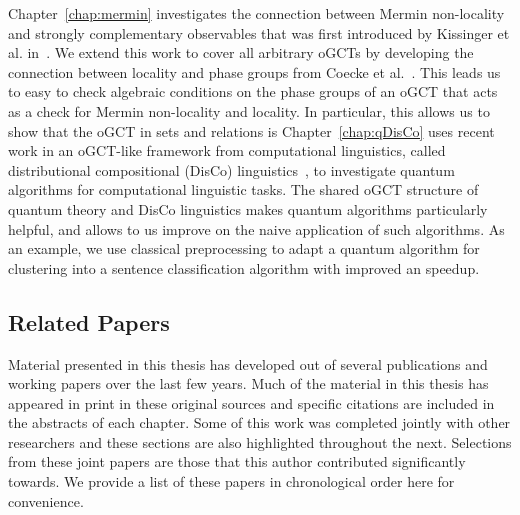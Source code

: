Chapter~\ref{chap:mermin} investigates the connection between Mermin non-locality and strongly complementary observables that was first introduced by Kissinger et al. in~\cite{coecke2012strong}. We extend this work to cover all arbitrary oGCTs by developing the connection between locality and phase groups from Coecke et al.~\cite{coecke2011phase}. This leads us to easy to check algebraic conditions on the phase groups of an oGCT that acts as a check for Mermin non-locality and locality. In particular, this allows us to show that the oGCT in sets and relations is 
Chapter~\ref{chap:qDisCo} uses recent work in an oGCT-like framework from computational linguistics, called distributional compositional (DisCo) linguistics~\cite{clark2008compositional}, to investigate quantum algorithms for computational linguistic tasks. The shared oGCT structure of quantum theory and DisCo linguistics makes quantum algorithms particularly helpful, and allows to us improve on the naive application of such algorithms. As an example, we use classical preprocessing to adapt a quantum algorithm for clustering into a sentence classification algorithm with improved an speedup.

 
\subsection*{Related Papers}

Material presented in this thesis has developed out of several publications and working papers over the last few years. Much of the material in this thesis has appeared in print in these original sources and specific citations are included in the abstracts of each chapter. Some of this work was completed jointly with other researchers and these sections are also highlighted throughout the next.  Selections from these joint papers are those that this author contributed significantly towards. We provide a list of these papers in chronological order here for convenience.

